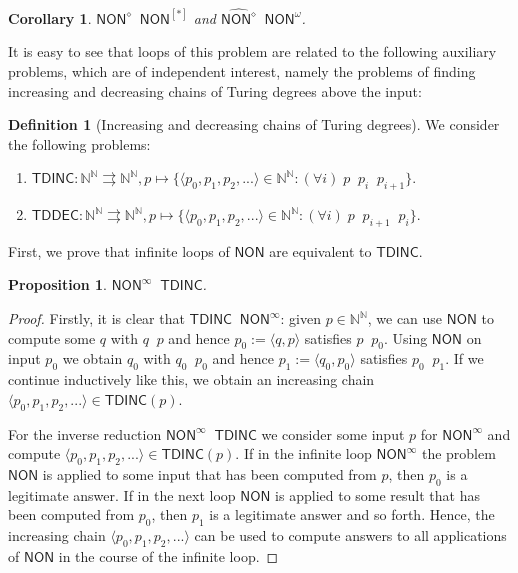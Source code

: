 \documentclass[11pt,a4paper]{amsart}
\theoremstyle{plain}
\newtheorem{cor}[thm]{Corollary}
\newtheorem{prop}[thm]{Proposition}
\theoremstyle{definition}
\newtheorem{defi}[thm]{Definition}
\theoremstyle{defC}
\theoremstyle{thmC}
\theoremstyle{plain}
\numberwithin{equation}{section}
\def\TDINC{\mathsf{TDINC}}
\def\TDDEC{\mathsf{TDDEC}}
\def\NON{\mathsf{NON}}
\def\IN{{\mathbb{N}}}
\def\mto{\rightrightarrows}
\def\lT{\mathop{<_{\mathrm{T}}}}
\def\nleqT{\mathop{\not\leq_{\mathrm{T}}}}
\def\leqW{\mathop{\leq_{\mathrm{W}}}}
\def\equivW{\mathop{\equiv_{\mathrm{W}}}}
\def\equivSW{\mathop{\equiv_{\mathrm{sW}}}}
\def\leqW{\mathop{\leq_{\mathrm{W}}}}
\def\equivW{\mathop{\equiv_{\mathrm{W}}}}
\def\equivSW{\mathop{\equiv_{\mathrm{sW}}}}
\begin{document}
\begin{cor}
\label{cor:NON}
$\NON^\diamond\equivSW\NON^{[*]}$ and $\widehat{\NON^\diamond}\equivSW \NON^\omega$.
\end{cor}

\noindent
It is easy to see that loops of this problem are related to the following auxiliary problems, which are of independent interest,
namely the problems of finding increasing and decreasing chains of Turing degrees above the input:

\begin{defi}[Increasing and decreasing chains of Turing degrees]
We consider the following problems:
\begin{enumerate}
\item $\TDINC:\IN^\IN\mto\IN^\IN,p\mapsto\{\langle p_0,p_1,p_2,...\rangle\in\IN^\IN:(\forall i)\;p\lT p_i\lT p_{i+1}\}$.
\item $\TDDEC:\IN^\IN\mto\IN^\IN,p\mapsto\{\langle p_0,p_1,p_2,...\rangle\in\IN^\IN:(\forall i)\;p\lT p_{i+1}\lT p_{i}\}$.
\end{enumerate}
\end{defi}

\noindent
First, we prove that infinite loops of $\NON$ are equivalent to $\TDINC$.

\begin{prop}
\label{prop:TDINC}
$\NON^\infty\equivW\TDINC$.
\end{prop}
\begin{proof}
Firstly, it is clear that $\TDINC\leqW\NON^\infty$: given $p\in\IN^\IN$, we can use $\NON$
to compute some $q$ with $q\nleqT p$ and hence $p_0:=\langle q,p\rangle$ satisfies $p\lT p_0$.
Using $\NON$ on input $p_0$ we obtain $q_0$ with $q_0\nleqT p_0$ and hence $p_1:=\langle q_0,p_0\rangle$
satisfies $p_0\lT p_1$. If we continue inductively like this, we obtain an increasing chain $\langle p_0,p_1,p_2,...\rangle\in\TDINC(p)$.

For the inverse reduction $\NON^\infty\leqW\TDINC$ we consider some input $p$ for $\NON^\infty$
and compute $\langle p_0,p_1,p_2,...\rangle\in\TDINC(p)$. If in the infinite loop $\NON^\infty$ the
problem $\NON$ is applied to some input that has been computed from $p$, then $p_0$ is a legitimate answer.
If in the next loop $\NON$ is applied to some result that has been computed from $p_0$, then $p_1$ is a 
legitimate answer and so forth. Hence, the increasing chain $\langle p_0,p_1,p_2,...\rangle$ can be used
to compute answers to all applications of $\NON$ in the course of the infinite loop. 
\end{proof}
\end{document}
